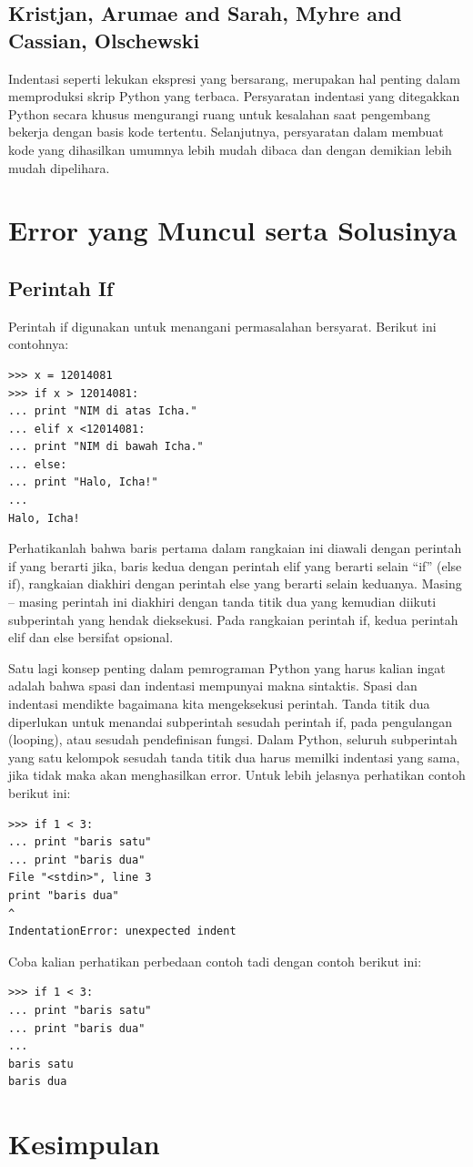 \documentclass[12pt]{article}
\begin{document}
\subsection{Kristjan, Arumae and Sarah, Myhre and Cassian, Olschewski}
Indentasi seperti lekukan ekspresi yang bersarang, merupakan hal penting dalam memproduksi skrip Python yang terbaca. Persyaratan indentasi yang ditegakkan Python secara khusus mengurangi ruang untuk kesalahan saat pengembang bekerja dengan basis kode tertentu. Selanjutnya, persyaratan dalam membuat kode yang dihasilkan umumnya lebih mudah dibaca dan dengan demikian lebih mudah dipelihara\cite{kristjansoccer}.


\section{Error yang Muncul serta Solusinya}
\subsection{Perintah If}
Perintah if digunakan untuk menangani permasalahan bersyarat. Berikut ini contohnya:
\begin{verbatim}
>>> x = 12014081
>>> if x > 12014081:
... print "NIM di atas Icha."
... elif x <12014081:
... print "NIM di bawah Icha."
... else:
... print "Halo, Icha!"
...
Halo, Icha!
\end{verbatim}

Perhatikanlah bahwa baris pertama dalam rangkaian ini diawali dengan perintah if yang berarti jika, baris kedua dengan perintah elif yang berarti selain “if” (else if), rangkaian diakhiri dengan perintah else yang berarti selain keduanya. Masing – masing perintah ini diakhiri dengan tanda titik dua yang kemudian diikuti subperintah yang hendak dieksekusi. Pada rangkaian perintah if, kedua perintah elif dan else bersifat opsional.

Satu lagi konsep penting dalam pemrograman Python yang harus kalian ingat adalah bahwa spasi dan indentasi mempunyai makna sintaktis. Spasi dan indentasi mendikte bagaimana kita mengeksekusi perintah. Tanda titik dua diperlukan untuk menandai subperintah sesudah perintah if, pada pengulangan (looping), atau sesudah pendefinisan fungsi. Dalam Python, seluruh subperintah yang satu kelompok sesudah tanda titik dua harus memilki indentasi yang sama, jika tidak maka akan menghasilkan error. Untuk lebih jelasnya perhatikan contoh berikut ini:

\begin{verbatim}
>>> if 1 < 3:
... print "baris satu"
... print "baris dua"
File "<stdin>", line 3
print "baris dua"
^
IndentationError: unexpected indent
\end{verbatim}

Coba kalian perhatikan perbedaan contoh tadi dengan contoh berikut ini:

\begin{verbatim}
>>> if 1 < 3:
... print "baris satu"
... print "baris dua"
...
baris satu
baris dua
\end{verbatim}

\section{Kesimpulan}
\end{document}
